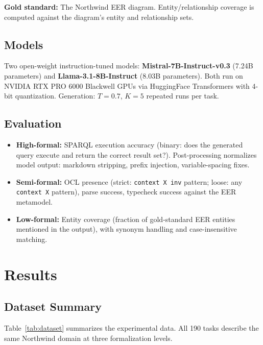 \documentclass[runningheads]{llncs}
\begin{document}
\textbf{Gold standard:} The Northwind EER diagram. Entity/relationship coverage is computed against the diagram's entity and relationship sets.

\subsection{Models}

Two open-weight instruction-tuned models: \textbf{Mistral-7B-Instruct-v0.3} (7.24B parameters) and \textbf{Llama-3.1-8B-Instruct} (8.03B parameters). Both run on NVIDIA RTX PRO 6000 Blackwell GPUs via HuggingFace Transformers with 4-bit quantization. Generation: $T\!=\!0.7$, $K\!=\!5$ repeated runs per task.

\subsection{Evaluation}

\begin{itemize}[noitemsep]
  \item \textbf{High-formal:} SPARQL execution accuracy (binary: does the generated query execute and return the correct result set?). Post-processing normalizes model output: markdown stripping, prefix injection, variable-spacing fixes.
  \item \textbf{Semi-formal:} OCL presence (strict: \texttt{context X inv} pattern; loose: any \texttt{context X} pattern), parse success, typecheck success against the EER metamodel.
  \item \textbf{Low-formal:} Entity coverage (fraction of gold-standard EER entities mentioned in the output), with synonym handling and case-insensitive matching.
\end{itemize}

\section{Results}
\label{sec:results}

\subsection{Dataset Summary}

Table~\ref{tab:dataset} summarizes the experimental data. All 190 tasks describe the same Northwind domain at three formalization levels.
\end{document}

